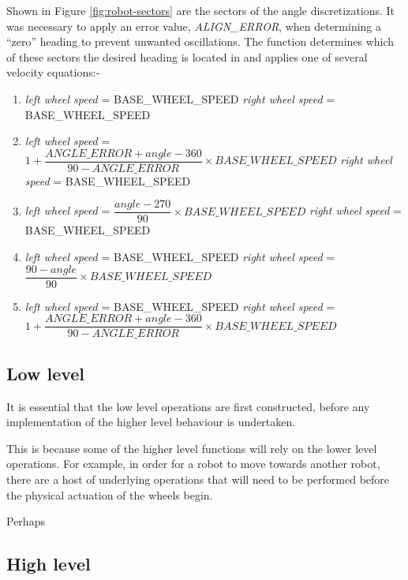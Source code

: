 Shown in Figure \ref{fig:robot-sectors} are the sectors of the angle discretizations. It was necessary to apply an error value, \textit{ALIGN\_ERROR}, when determining a ``zero'' heading to prevent unwanted oscillations. The function determines which of these sectors the desired heading is located in and applies one of several velocity equations:-

\begin{enumerate}
	\item \textit{left wheel speed} = BASE\_WHEEL\_SPEED \newline
	\textit{right wheel speed} = BASE\_WHEEL\_SPEED
	
	\item \textit{left wheel speed} = \(1 + \dfrac{ANGLE\_ERROR + angle - 360}{90 - ANGLE\_ERROR} \times BASE\_WHEEL\_SPEED\) \newline
	\textit{right wheel speed} = BASE\_WHEEL\_SPEED
	
	\item \textit{left wheel speed} = \(\dfrac{angle - 270}{90} \times BASE\_WHEEL\_SPEED\) \newline
	\textit{right wheel speed} = BASE\_WHEEL\_SPEED
	
	\item \textit{left wheel speed} = BASE\_WHEEL\_SPEED  \newline
	\textit{right wheel speed} = \(\dfrac{90 - angle}{90} \times BASE\_WHEEL\_SPEED\)
	
	\item \textit{left wheel speed} = BASE\_WHEEL\_SPEED  \newline
	\textit{right wheel speed} = \(1 + \dfrac{ANGLE\_ERROR + angle - 360}{90 - ANGLE\_ERROR} \times BASE\_WHEEL\_SPEED\)
	
\end{enumerate}

\subsection{Low level}

It is essential that the low level operations are first constructed, before any implementation of the higher level behaviour is undertaken. 

This is because some of the higher level functions will rely on the lower level operations. For example, in order for a robot to move towards another robot, there are a host of underlying operations that will need to be performed before the physical actuation of the wheels begin.

Perhaps



\subsection{High level}

